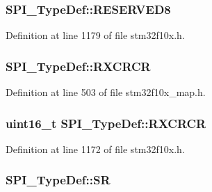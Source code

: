 \subsubsection[{\texorpdfstring{R\+E\+S\+E\+R\+V\+E\+D8}{RESERVED8}}]{ S\+P\+I\+\_\+\+Type\+Def\+::\+R\+E\+S\+E\+R\+V\+E\+D8}\hypertarget{struct_s_p_i___type_def_a0ffe762827b71caff20c75bf105387f6}{}\label{struct_s_p_i___type_def_a0ffe762827b71caff20c75bf105387f6}


Definition at line 1179 of file stm32f10x.\+h.

\subsubsection[{\texorpdfstring{R\+X\+C\+R\+CR}{RXCRCR}}]{ S\+P\+I\+\_\+\+Type\+Def\+::\+R\+X\+C\+R\+CR}\hypertarget{struct_s_p_i___type_def_afefaa00893bc9ef498ecf8ee4d092dd1}{}\label{struct_s_p_i___type_def_afefaa00893bc9ef498ecf8ee4d092dd1}


Definition at line 503 of file stm32f10x\+\_\+map.\+h.

\subsubsection[{\texorpdfstring{R\+X\+C\+R\+CR}{RXCRCR}}]{ {\bf uint16\+\_\+t} S\+P\+I\+\_\+\+Type\+Def\+::\+R\+X\+C\+R\+CR}\hypertarget{struct_s_p_i___type_def_ab53da6fb851d911ae0b1166be2cfe48a}{}\label{struct_s_p_i___type_def_ab53da6fb851d911ae0b1166be2cfe48a}


Definition at line 1172 of file stm32f10x.\+h.

\subsubsection[{\texorpdfstring{SR}{SR}}]{ S\+P\+I\+\_\+\+Type\+Def\+::\+SR}\hypertarget{struct_s_p_i___type_def_a6bb5bc6c1e6ad605287e4144d43e422c}{}\label{struct_s_p_i___type_def_a6bb5bc6c1e6ad605287e4144d43e422c}


